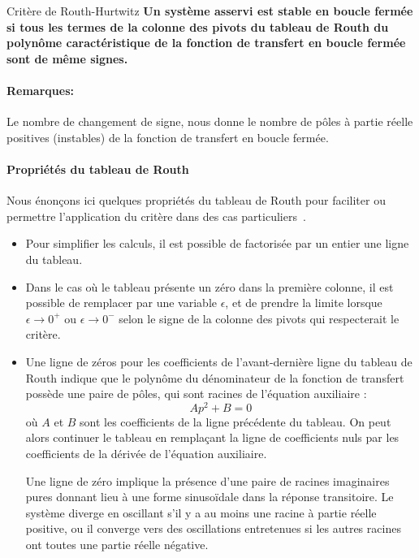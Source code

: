 \begin{criteria}{Critère de Routh-Hurtwitz}
    \textbf{Un système asservi est stable en boucle fermée
            si tous les termes de la colonne des pivots 
            du tableau de Routh du polynôme caractéristique 
            de la fonction de transfert en boucle fermée sont de même signes.}
\end{criteria}

\paragraph{Remarques:}
Le nombre de changement de signe, nous donne le nombre de pôles à partie 
réelle positives (instables) de la fonction de transfert en boucle fermée.


\paragraph{Propriétés du tableau de Routh}

Nous énonçons ici quelques propriétés du tableau de Routh 
pour faciliter ou permettre l'application du critère dans 
des cas particuliers~\cite{Ostertag}. 

\begin{itemize}
    \item Pour simplifier les calculs, il est possible de factorisée par un 
          entier une ligne du tableau.
    \item Dans le cas où le tableau présente un zéro dans la première 
          colonne, il est possible de remplacer par une variable $\epsilon$, 
          et de prendre la limite lorsque $\epsilon\rightarrow 0^+$ ou 
          $\epsilon\rightarrow 0^-$ selon le signe de la colonne des pivots
          qui respecterait le critère.
    \item Une ligne de zéros pour les coefficients de l'avant-dernière ligne 
          du tableau de Routh indique que le polynôme du dénominateur de la 
          fonction de transfert possède une paire de pôles, qui sont racines de 
          l'équation auxiliaire :
    $$
    Ap^2+B=0
    $$
    où $A$ et $B$ sont les coefficients de la ligne précédente du tableau. 
    On peut alors continuer le tableau en remplaçant la ligne de coefficients 
    nuls par les coefficients de la dérivée de l'équation auxiliaire. 
    
    Une ligne de zéro implique la présence d'une paire de racines imaginaires 
    pures donnant lieu à une forme sinuso\"idale dans la réponse transitoire.
    Le système diverge en oscillant s'il y a au moins une racine à partie 
    réelle positive, ou il converge vers des oscillations entretenues si les 
    autres racines ont toutes une partie réelle négative.
\end{itemize}

